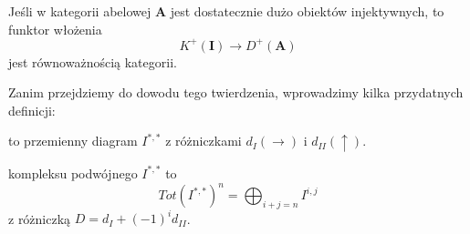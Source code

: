 \begin{theorem}
  Jeśli w kategorii abelowej $\mathbf{A}$ jest dostatecznie dużo obiektów injektywnych, to funktor włożenia
  $$K^+(\mathbf{I})\to D^+(\mathbf{A})$$
  jest równoważnością kategorii.
\end{theorem}

Zanim przejdziemy do dowodu tego twierdzenia, wprowadzimy kilka przydatnych definicji:

  \begin{definition}
     to przemienny diagram $I^{*,*}$ z różniczkami $d_I(\to)$ i $d_{II}(\uparrow)$.

     kompleksu podwójnego $I^{*,*}$ to 
    $$Tot(I^{*,*})^n=\bigoplus_{i+j=n}I^{i,j}$$
    z różniczką $D=d_I+(-1)^id_{II}$. 
  \end{definition}

